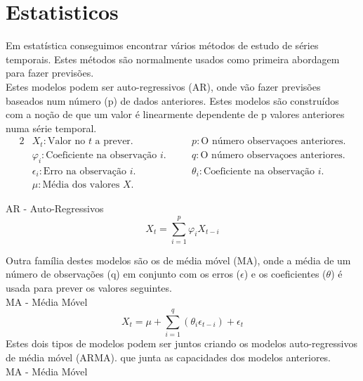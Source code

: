 \section{Estatisticos}

Em estatística conseguimos encontrar vários métodos de estudo de séries temporais. Estes métodos são normalmente usados como primeira abordagem para fazer previsões.\\
Estes modelos podem ser auto-regressivos (AR), onde vão fazer previsões baseados num número (p) de dados anteriores. Estes modelos são construídos com a noção de que um valor é linearmente dependente de p valores anteriores numa série temporal.\\

\begin{alignat*}{2} 
    & X_{t} : \text{Valor no } t \text{ a prever.} &\quad& p : \text{O número observaçoes anteriores.} \\
    & \varphi_{i} : \text{Coeficiente na observação } i. &\quad& q : \text{O número observaçoes anteriores.} \\
    & \epsilon_{i} : \text{Erro na observação } i. &\quad& \theta_{i} : \text{Coeficiente na observação } i \text{.} \\ 
    & \mu : \text{Média dos valores } X \text{.} 
\end{alignat*}

\bigskip
AR - Auto-Regressivos \\

\begin{equation} \label{eq:ar} 
    X_{t} = \sum_{i=1}^{p}\varphi_{i} X_{t-i} 
\end{equation}
\smallskip

Outra família destes modelos são os de média móvel (MA), onde a média de um número de observações (q) em conjunto com os erros ($\epsilon$) e os coeficientes ($\theta$) é usada para prever os valores seguintes.\\
\bigskip
MA - Média Móvel \\

\begin{equation} \label{eq:ma} 
    X_{t} = \mu + \sum_{i=1}^{q}(\theta_{i} \epsilon_{t-i}) + \epsilon_{t}
\end{equation}
\smallskip
Estes dois tipos de modelos podem ser juntos criando os modelos auto-regressivos de média móvel (ARMA). que junta as capacidades dos modelos anteriores.\\

\bigskip
MA - Média Móvel \\

